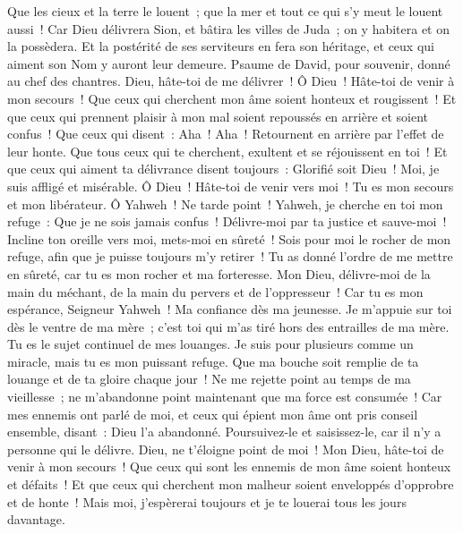 \begin{multicols}{2}
Que les cieux et la terre le louent~; que la mer et tout ce qui s'y meut le louent aussi~!
Car Dieu délivrera Sion, et bâtira les villes de Juda~; on y habitera et on la possèdera.
Et la postérité de ses serviteurs en fera son héritage, et ceux qui aiment son Nom y auront leur demeure.
\VerseOne{}Psaume de David, pour souvenir, donné au chef des chantres.
Dieu, hâte-toi de me délivrer~! Ô Dieu~! Hâte-toi de venir à mon secours~!
Que ceux qui cherchent mon âme soient honteux et rougissent~! Et que ceux qui prennent plaisir à mon mal soient repoussés en arrière et soient confus~!
Que ceux qui disent~: Aha~! Aha~! Retournent en arrière par l'effet de leur honte.
Que tous ceux qui te cherchent, exultent et se réjouissent en toi~! Et que ceux qui aiment ta délivrance disent toujours~: Glorifié soit Dieu~!
Moi, je suis affligé et misérable. Ô Dieu~! Hâte-toi de venir vers moi~! Tu es mon secours et mon libérateur. Ô Yahweh~! Ne tarde point~!
\VerseOne{}Yahweh, je cherche en toi mon refuge~: Que je ne sois jamais confus~!
Délivre-moi par ta justice et sauve-moi~! Incline ton oreille vers moi, mets-moi en sûreté~!
Sois pour moi le rocher de mon refuge, afin que je puisse toujours m'y retirer~! Tu as donné l'ordre de me mettre en sûreté, car tu es mon rocher et ma forteresse.
Mon Dieu, délivre-moi de la main du méchant, de la main du pervers et de l'oppresseur~!
Car tu es mon espérance, Seigneur Yahweh~! Ma confiance dès ma jeunesse.
Je m'appuie sur toi dès le ventre de ma mère~; c'est toi qui m'as tiré hors des entrailles de ma mère. Tu es le sujet continuel de mes louanges.
Je suis pour plusieurs comme un miracle, mais tu es mon puissant refuge.
Que ma bouche soit remplie de ta louange et de ta gloire chaque jour~!
Ne me rejette point au temps de ma vieillesse~; ne m'abandonne point maintenant que ma force est consumée~!
Car mes ennemis ont parlé de moi, et ceux qui épient mon âme ont pris conseil ensemble,
disant~: Dieu l'a abandonné. Poursuivez-le et saisissez-le, car il n'y a personne qui le délivre.
Dieu, ne t'éloigne point de moi~! Mon Dieu, hâte-toi de venir à mon secours~!
Que ceux qui sont les ennemis de mon âme soient honteux et défaits~! Et que ceux qui cherchent mon malheur soient enveloppés d'opprobre et de honte~!
Mais moi, j'espèrerai toujours et je te louerai tous les jours davantage.

\end{multicols}
